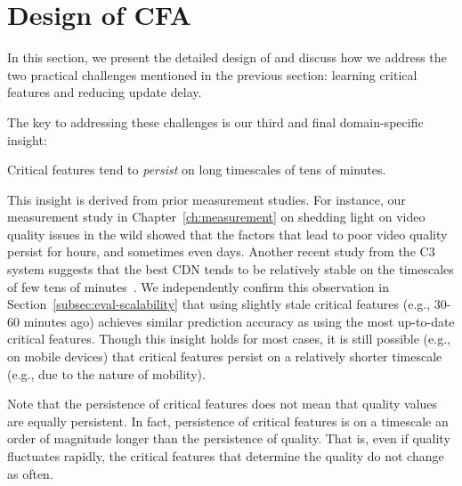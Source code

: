 \section{Design of CFA}
\label{sec:cfa:design}

In this section, we present the detailed design of \dda 
and discuss how we address the two practical challenges 
mentioned in the previous section: learning critical features 
and reducing update delay.

The key  to addressing these challenges
 is our third and final domain-specific insight:

\begin{insight}
Critical features tend to {\em persist} on long timescales
of tens of minutes.
\label{insight:persistence}
\end{insight}

 This insight is derived from prior measurement 
 studies.
 For instance, our measurement study in 
 Chapter~\ref{ch:measurement} 
 on shedding light on video quality issues in the wild showed 
 that the factors that lead to poor video quality persist
 for hours, and sometimes even days.  
 Another recent study from the C3 system suggests that 
 the best CDN tends to be relatively stable on the 
 timescales of few tens of minutes~\cite{c3}.  
We independently confirm this observation in 
Section~\ref{subsec:eval-scalability} that 
using slightly stale critical features (e.g., 30-60 minutes 
 ago) achieves similar prediction accuracy as using the 
most up-to-date critical features.
Though this insight holds for most cases, it is still possible
(e.g., on mobile devices) that critical features persist on a 
relatively shorter timescale (e.g., due to the nature of 
mobility).



Note that the persistence of critical features does not 
mean that quality values are equally persistent.  
In fact, persistence of critical features is on a 
timescale an order of magnitude longer than 
the persistence of quality.  
That is, even if quality fluctuates rapidly, the critical 
features that determine the quality do not change 
as often.


